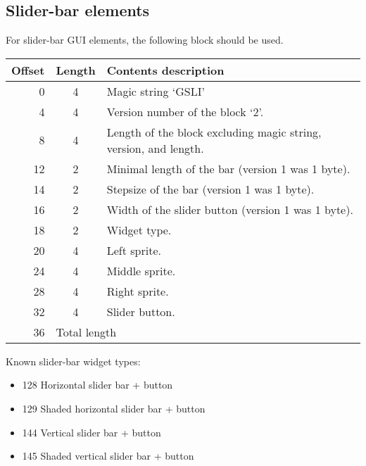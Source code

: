 \documentclass{article}
\begin{document}
\subsection{Slider-bar elements}
For slider-bar GUI elements, the following block
should be used.
\begin{center}
\begin{tabular}{|r|c|l|} \hline
\textbf{Offset} & \textbf{Length} & \textbf{Contents description} \\ \hline
   0 &  4 & Magic string `GSLI' \\
   4 &  4 & Version number of the block `2'. \\
   8 &  4 & Length of the block excluding magic string, version, and length. \\
  12 &  2 & Minimal length of the bar (version 1 was 1 byte). \\
  14 &  2 & Stepsize of the bar (version 1 was 1 byte). \\
  16 &  2 & Width of the slider button (version 1 was 1 byte). \\
  18 &  2 & Widget type. \\
  20 &  4 & Left sprite. \\
  24 &  4 & Middle sprite. \\
  28 &  4 & Right sprite. \\
  32 &  4 & Slider button. \\
  36 & \multicolumn{2}{l|}{Total length} \\ \hline
\end{tabular}
\end{center}

Known slider-bar widget types:
\begin{itemize}
\item 128 Horizontal slider bar + button
\item 129 Shaded horizontal slider bar + button
\item 144 Vertical slider bar + button
\item 145 Shaded vertical slider bar + button
\end{itemize}
\end{document}
